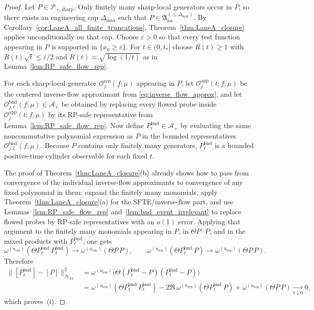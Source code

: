 \begin{proof}
Let $P\in\mathcal P_{+,\mathrm{sharp}}$.
Only finitely many sharp-local generators occur in $P$, so there exists an engineering cap $\Delta_{\max}$ such that
$P\in\mathfrak A_{\mathrm{loc}}^{(\le \Delta_{\max})}$.
By Corollary~\ref{cor:LaneA_all_finite_truncations}, Theorem~\ref{thm:LaneA_closure} applies unconditionally on that cap.
Choose $\varepsilon>0$ so that every test function appearing in $P$ is supported in $\{x_0\ge \varepsilon\}$.
For $t\in(0,t_\ast]$ choose $R(t)\ge 1$ with $R(t)\sqrt t\le \varepsilon/2$ and $R(t)\asymp\sqrt{\log(1/t)}$ as in Lemma~\ref{lem:RP_safe_flow_rep}.

For each sharp-local generator $\mathcal O^{\mathrm{ren}}_j(f;\mu)$ appearing in $P$, let
$\mathcal O^{\mathrm{app}}_j(t;f;\mu)$ be the centered inverse-flow approximant from \eqref{eq:inverse_flow_approx},
and let $\mathcal O^{\mathrm{bnd}}_{j,t}(f;\mu)\in\mathcal A_+$ be obtained by replacing every flowed probe inside
$\mathcal O^{\mathrm{app}}_j(t;f;\mu)$ by its RP-safe representative from Lemma~\ref{lem:RP_safe_flow_rep}.
Now define $P_t^{\mathrm{bnd}}\in\mathcal A_+$ by evaluating the same noncommutative polynomial expression as $P$
in the bounded representatives $\mathcal O^{\mathrm{bnd}}_{j,t}(f;\mu)$.
Because $P$ contains only finitely many generators, $P_t^{\mathrm{bnd}}$ is a bounded positive-time cylinder observable for each fixed $t$.

The proof of Theorem~\ref{thm:LaneA_closure}(b) already shows how to pass from convergence of the individual inverse-flow approximants
to convergence of any fixed polynomial in them: expand the finitely many monomials, apply Theorem~\ref{thm:LaneA_closure}(a)
for the SFTE/inverse-flow part, and use Lemmas~\ref{lem:RP_safe_flow_rep} and~\ref{lem:bad_event_irrelevant} to replace flowed probes by RP-safe representatives with an $o(1)$ error.
Applying that argument to the finitely many monomials appearing in $P$, in $\Theta P\cdot P$, and in the mixed products with $P_t^{\mathrm{bnd}}$, one gets
\[
\omega^{(u_{\mathrm{ren}})}(\Theta P_t^{\mathrm{bnd}}\,P_t^{\mathrm{bnd}})\to \omega^{(u_{\mathrm{ren}})}(\Theta P\,P),
\qquad
\omega^{(u_{\mathrm{ren}})}(\Theta P_t^{\mathrm{bnd}}\,P)\to \omega^{(u_{\mathrm{ren}})}(\Theta P\,P).
\]
Therefore
\begin{align*}
\|[P_t^{\mathrm{bnd}}]-[P]\|_{\mathcal H_{\mathrm{loc}}}^2
&=\omega^{(u_{\mathrm{ren}})}\!\big(\Theta(P_t^{\mathrm{bnd}}-P)(P_t^{\mathrm{bnd}}-P)\big)\\
&=\omega^{(u_{\mathrm{ren}})}(\Theta P_t^{\mathrm{bnd}}\,P_t^{\mathrm{bnd}})
-2\Re\,\omega^{(u_{\mathrm{ren}})}(\Theta P_t^{\mathrm{bnd}}\,P)
+\omega^{(u_{\mathrm{ren}})}(\Theta P\,P)
\xrightarrow[t\downarrow 0]{}0,
\end{align*}
which proves~(i).


\end{proof}
